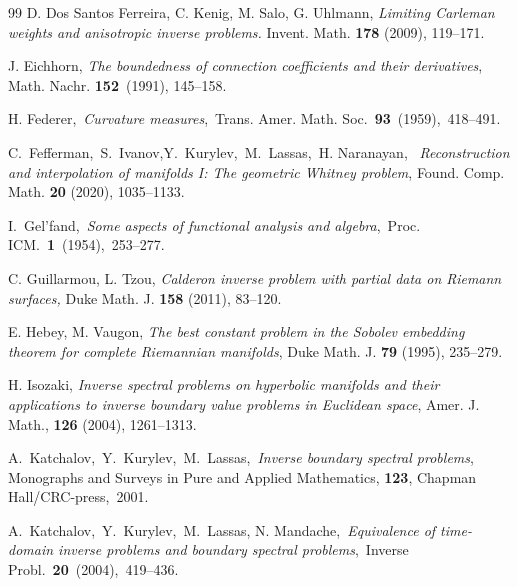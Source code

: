 \documentclass[11pt,letterpaper]{amsart}
\numberwithin{equation}{section}
\theoremstyle{definition}
\theoremstyle{plain}
\theoremstyle{definition}
\theoremstyle{plain}
\theoremstyle{definition}
\theoremstyle{plain}
\begin{document}
\begin{thebibliography}{99}
D. Dos Santos Ferreira, C. Kenig, M. Salo, G. Uhlmann, \emph{Limiting Carleman weights and anisotropic inverse problems.} Invent. Math. {\bf 178}  (2009), 119--171.


 J. Eichhorn, \emph{The boundedness of connection coefficients and their derivatives}, Math. Nachr. \textbf{152}~(1991), 145--158.

 H. Federer,~\emph{Curvature measures},~Trans. Amer. Math. Soc.~\textbf{93}~(1959),~418--491.

 C.~Fefferman,~S.~Ivanov,Y.~Kurylev,~M.~Lassas,~H. Naranayan,
~\emph{Reconstruction and interpolation of manifolds I: The geometric Whitney problem}, Found. Comp. Math.
\textbf{20} (2020), 1035--1133.

 I.~Gel'fand,~\emph{Some aspects of functional analysis and algebra},~Proc. ICM.~\textbf{1}~(1954),~253--277.

C. Guillarmou, L. Tzou, \emph{Calderon inverse problem with partial data on Riemann surfaces,} Duke Math. J. {\bf 158} (2011), 83--120.

 E. Hebey, M. Vaugon, \emph{The best constant problem in the Sobolev embedding theorem for complete Riemannian manifolds}, Duke Math. J. \textbf{79} (1995), 235--279.

H. Isozaki, \emph{Inverse spectral problems on hyperbolic manifolds and their applications to inverse boundary value problems in Euclidean space}, Amer. J. Math., {\bf 126} (2004), 1261--1313.

 A.~Katchalov,~Y.~Kurylev,~M.~Lassas,~\emph{Inverse boundary spectral problems}, Monographs and Surveys in Pure and Applied Mathematics, \textbf{123}, Chapman Hall/CRC-press,~2001.

 A.~Katchalov,~Y.~Kurylev,~M.~Lassas, N. Mandache,~\emph{Equivalence of time-domain inverse problems and boundary spectral problems},~Inverse Probl.~\textbf{20}~(2004),~419--436.




\end{thebibliography}
\end{document}
